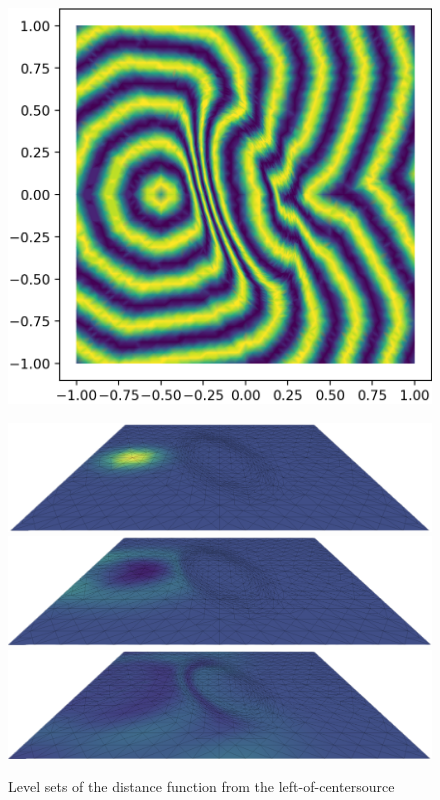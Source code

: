\begin{figure}
    \centering
    \hspace*{-6mm}\includegraphics[width=0.9\columnwidth]{../images/bell_wave_distances.png
    }\vspace*{10mm}
    \caption{Level sets of the distance function from the left-of-centersource}
    \label{fig:dijkstra}
    \includegraphics[width=0.9\columnwidth]{../images/bell_wave_0.png}\vspace*{3mm}
    \includegraphics[width=0.9\columnwidth]{../images/bell_wave_1.png}\vspace*{3mm}
    \includegraphics[width=0.9\columnwidth]{../images/bell_wave_2.png}\vspace*{3mm}

\end{figure}
